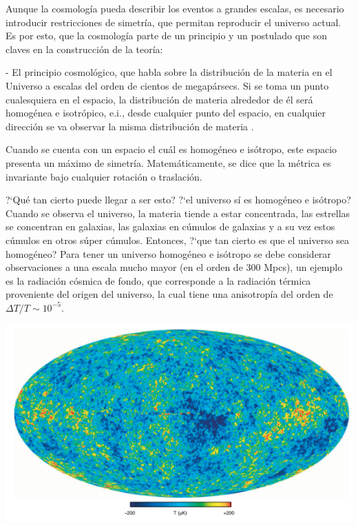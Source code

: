 Aunque la cosmología pueda describir los eventos a grandes escalas, es necesario introducir restricciones de simetría, que permitan reproducir el universo actual. Es por esto, que la cosmología parte de un principio y un postulado que son claves en la construcción de la teoría:  

- El principio cosmológico, que habla sobre la distribución de la materia en el Universo a escalas del orden de cientos de megapársecs. Si se toma un punto cualesquiera en el espacio, la distribución de materia alrededor de él será homogénea e isotrópico, e.i., desde cualquier punto del espacio, en cualquier dirección se va observar la misma distribución de materia 
\cite{janssen2013}. %


Cuando se cuenta con un espacio el cuál es homogéneo e isótropo, este espacio presenta un máximo de simetría.  Matemáticamente, se dice que la métrica es invariante bajo cualquier rotación o traslación. 

?`Qué tan cierto puede llegar a ser esto? ?`el universo sí es homogéneo e isótropo? Cuando se observa el universo, la materia tiende a estar concentrada, las estrellas se concentran en galaxias, las galaxias en cúmulos de galaxias y a su vez estos cúmulos en otros súper cúmulos. Entonces, ?`que tan cierto es que el universo sea homogéneo? Para tener un universo homogéneo e isótropo se debe considerar observaciones a una escala mucho mayor (en el orden de $300$ Mpcs), un ejemplo es la radiación cósmica de fondo, que corresponde a la radiación térmica proveniente del origen del universo, la cual tiene una anisotropía del orden de $\Delta T /T \sim 10^{-5}$\cite{bond1987}. 

\begin{center}
\includegraphics[scale=.5]{./figures/2_theoretical_framework/backgraundCosmicRadiation.png}
\label{fig:radiación_cosmica_de_fondo}
\end{center}

